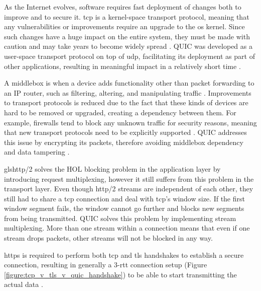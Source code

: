 As the Internet evolves, software requires fast deployment of changes both to improve and to secure it. \gls{tcp} is a kernel-space transport protocol, meaning that any vulnerabilities or improvements require an upgrade to the \gls{os} kernel. Since such changes have a huge impact on the entire system, they must be made with caution and may take years to become widely spread \cite{rfc9000}. QUIC was developed as a user-space transport protocol on top of \gls{udp}, facilitating its deployment as part of other applications, resulting in meaningful impact in a relatively short time \cite{quic_protocol}.

A middlebox is when a device adds functionality other than packet forwarding to an IP router, such as filtering, altering, and manipulating traffic \cite{rfc3234}. Improvements to transport protocols is reduced due to the fact that these kinds of devices are hard to be removed or upgraded, creating a dependency between them. For example, firewalls tend to block any unknown traffic for security reasons, meaning that new transport protocols need to be explicitly supported \cite{rfc3234}. QUIC addresses this issue by encrypting its packets, therefore avoiding middlebox dependency and data tampering \cite{quic_protocol}.

gls{http}/2 solves the HOL blocking problem in the application layer by introducing request multiplexing, however it still suffers from this problem in the transport layer. Even though \gls{http}/2 streams are independent of each other, they still had to share a \gls{tcp} connection and deal with \gls{tcp}’s window size. If the first window segment fails, the window cannot go further and blocks new segments from being transmitted. QUIC solves this problem by implementing stream multiplexing. More than one stream within a connection means that even if one stream drops packets, other streams will not be blocked in any way.

\gls{https} is required to perform both \gls{tcp} and \gls{tls} handshakes to establish a secure connection, resulting in generally a 3-\gls{rtt} connection setup (Figure \ref{figure:tcp_v_tls_v_quic_handshake}) to be able to start transmitting the actual data \cite{rfc7413}.

